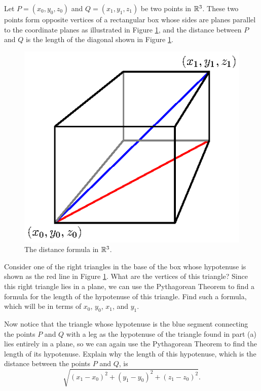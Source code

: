 \begin{activity} \label{A:9.1.4}
    Let $P=(x_0, y_0, z_0)$ and $Q=(x_1, y_1, z_1)$ be two points in $\mathbb{R}^3$. These two points form opposite vertices of a rectangular box whose sides are planes parallel to the coordinate planes as illustrated in Figure \ref{F:9.1.Distance_3D}, and the distance between $P$ and $Q$ is the length of the diagonal shown in Figure \ref{F:9.1.Distance_3D}.
    \begin{figure}[ht]
\begin{center}
  \includegraphics{figures/fig_9_1_distance.eps}
\caption{The distance formula in $\mathbb{R}^3$.}
\label{F:9.1.Distance_3D}
\end{center}
\end{figure}
    \ba
  \item Consider one of the right triangles in the base of the box whose
    hypotenuse is shown as the red line in Figure
    \ref{F:9.1.Distance_3D}. What are the vertices of this triangle?
    Since this right triangle lies in a plane, we can use the
    Pythagorean Theorem to find a formula for the length of the
    hypotenuse of this triangle. Find such a formula, which will be in
    terms of $x_0$, $y_0$, $x_1$, and $y_1$.

  \item Now notice that the triangle whose hypotenuse is the blue segment
    connecting the points $P$ and $Q$ with a leg as the hypotenuse of
    the triangle found in part (a) lies entirely in a plane, so we can
    again use the Pythagorean Theorem to find the length of its
    hypotenuse. Explain why the length of this hypotenuse, which is
    the distance between the points $P$ and $Q$, is
        \begin{equation*} %
        \sqrt{(x_1-x_0)^2 + (y_1-y_0)^2 + (z_1-z_0)^2}.
        \end{equation*}

    \ea
\end{activity}
